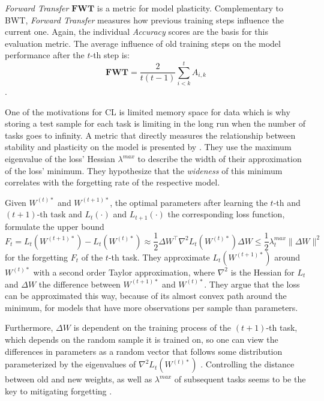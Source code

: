 \textit{Forward Transfer} $\mathbf{FWT}$ is a metric for model plasticity. Complementary to BWT, \textit{Forward Transfer} measures how previous training steps influence the current one. Again, the individual \textit{Accuracy} scores are the basis for this evaluation metric. The average influence of old training steps on the model performance after the $t$-th step is:
\begin{equation}
	\mathbf{FWT} = \frac{2}{t(t-1)}\sum_{i < k }^{t} A_{i,k}
\end{equation}.

One of the motivations for CL is limited memory space for data which is why storing a test sample for each task is limiting in the long run when the number of tasks goes to infinity. A metric that directly measures the relationship between stability and plasticity on the model is presented by \citeauthor{mirzadeh2020understandingroletrainingregimes}\cite{mirzadeh2020understandingroletrainingregimes}. They use the maximum eigenvalue of the loss' Hessian $\lambda^{max}$ to describe the width of their approximation of the loss' minimum. They hypothesize that the \textit{wideness} of this minimum correlates with the forgetting rate of the respective model.

Given $W^{(t)*}$ and $W^{(t+1)*}$, the optimal parameters after learning the $t$-th and $(t+1)$-th task and $L_t(\cdot)$ and $L_{t+1}(\cdot)$ the corresponding loss function, \citeauthor{mirzadeh2020understandingroletrainingregimes} formulate the upper bound
\begin{equation}\label{2TA}
	F_t = L_t(W^{(t+1)*}) - L_t(W^{(t)*}) \approx \frac{1}{2}{\Delta W}^\top \nabla^2 L_t(W^{(t)*}) \Delta W \leq \frac{1}{2}\lambda_t^{max}\lVert \Delta W \rVert^2
\end{equation}
for the forgetting $F_t$ of the $t$-th task. They approximate $L_t(W^{(t+1)*})$ around $W^{(t)*}$ with a second order Taylor approximation, where $\nabla^2$ is the Hessian for $L_t$ and $\Delta W$ the difference between $W^{(t+1)*}$ and $W^{(t)*}$. They argue that the loss can be approximated this way, because of its almost convex path around the minimum, for models that have more observations per sample than parameters.

Furthermore, ${\Delta W}$ is dependent on the training process of the $(t+1)$-th task, which depends on the random sample it is trained on, so one can view the differences in parameters as a random vector that follows some distribution parameterized by the eigenvalues of $\nabla^2 L_t(W^{(t)*})$ \cite{mirzadeh2020understandingroletrainingregimes}. Controlling the distance between old and new weights, as well as $\lambda^{max}$ of subsequent tasks seems to be the key to mitigating forgetting \cite{mirzadeh2020understandingroletrainingregimes}.

